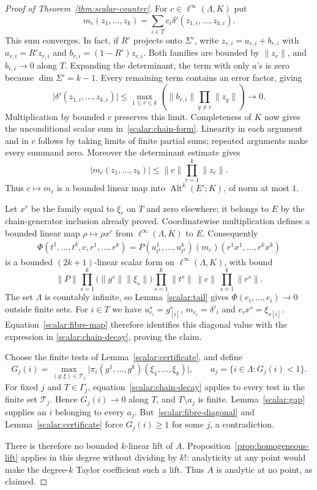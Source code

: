 \documentclass[11pt]{amsart}
\theoremstyle{definition}
\theoremstyle{remark}
\numberwithin{equation}{section}
\newcommand{\Alt}{\operatorname{Alt}}
\newcommand{\linf}{\ell^\infty}
\newcommand{\abs}[1]{\lvert #1\rvert}
\newcommand{\norm}[1]{\lVert #1\rVert}
\begin{document}
\begin{proof}[Proof of Theorem~\ref{thm:scalar-counter}]
For $c\in\linf(\Lambda,K)$ put
\begin{equation}\label{scalar:chain-form}
 m_c(z_1,\dots,z_k)=\sum_{i\in T}c_i\delta'(z_{1,i},\dots,z_{k,i}).
\end{equation}
This sum converges. In fact, if $R'$ projects onto $\Sigma'$, write
$z_{r,i}=a_{r,i}+b_{r,i}$ with $a_{r,i}=R'z_{r,i}$ and $b_{r,i}=(1-R')z_{r,i}$. Both families are bounded
by $\norm{z_r}$, and $b_{r,i}\to0$ along $T$. Expanding the determinant, the term with only $a$'s is
zero because $\dim\Sigma'=k-1$. Every remaining term contains an error factor, giving
\[
 \abs{\delta'(z_{1,i},\dots,z_{k,i})}
 \le\max_{1\le r\le k}\left(\norm{b_{r,i}}\prod_{q\ne r}\norm{z_q}\right)
 \longrightarrow0.
\]
Multiplication by bounded $c$ preserves this limit. Completeness of $K$ now gives the unconditional
scalar sum in~\eqref{scalar:chain-form}. Linearity in each argument and in $c$ follows by taking limits
of finite partial sums; repeated arguments make every summand zero. Moreover the determinant estimate gives
\[
 \abs{m_c(z_1,\dots,z_k)}\le\norm c\prod_{r=1}^k\norm{z_r}.
\]
Thus $c\mapsto m_c$ is a bounded linear map into $\Alt^k(E';K)$, of norm at most $1$.

Let $x^r$ be the family equal to $\xi_r$ on $T$ and zero elsewhere; it belongs to $E$ by the
chain-generator inclusion already proved. Coordinatewise multiplication defines a bounded linear map
$\rho\mapsto\rho x^r$ from $\linf(\Lambda,K)$ to $E$. Consequently
\[
 \begin{split}
 \Phi(t^1,\dots,t^k,c,r^1,\dots,r^k)
   =P(u^1_{t^1},\dots,u^k_{t^k})(m_c)(r^1x^1,\dots,r^kx^k)
 \end{split}
\]
is a bounded $(2k+1)$\nobreakdash-linear scalar form on $\linf(\Lambda,K)$, with bound
\[
 \norm P\prod_{s=1}^k\bigl(\norm{g^s}\norm{\xi_s}\bigr)
       \prod_{s=1}^k\norm{t^s}\,\norm c\,\prod_{s=1}^k\norm{r^s}.
\]
The set $\Lambda$ is countably infinite, so Lemma~\ref{scalar:tail} gives
$\Phi(e_i,\dots,e_i)\to0$ outside finite sets. For $i\in T$ we have
$u^s_{e_i}=g^s_{[i]}$, $m_{e_i}=\delta'_i$ and $e_i x^s=\xi_{s[i]}$.
Equation~\eqref{scalar:fibre-map} therefore identifies this diagonal value with the expression in
\eqref{scalar:chain-decay}, proving the claim.

Choose the finite tests of Lemma~\ref{scalar:certificate}, and define
\[
 G_j(i)=\max_{(g;\xi)\in\mathcal T_j}
       \abs{\pi_i(g^1,\dots,g^k)(\xi_1,\dots,\xi_k)},
 \qquad a_j=\{i\in\Lambda:G_j(i)<1\}.
\]
For fixed $j$ and $T\in\Gamma_j$, equation~\eqref{scalar:chain-decay} applies to every test in the finite
set $\mathcal T_j$. Hence $G_j(i)\to0$ along $T$, and $T\setminus a_j$ is finite. Lemma~\ref{scalar:gap}
supplies an $i$ belonging to every $a_j$. But~\eqref{scalar:fibre-diagonal} and
Lemma~\ref{scalar:certificate} force $G_j(i)\ge1$ for some $j$, a contradiction.

There is therefore no bounded $k$\nobreakdash-linear lift of $A$. Proposition~\ref{prop:homogeneous-lift} applies in
this degree without dividing by $k!$: analyticity at any point would make the degree-$k$ Taylor coefficient
such a lift. Thus $A$ is analytic at no point, as claimed.
\end{proof}
\end{document}
